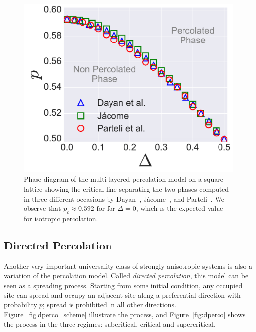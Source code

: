 \begin{figure}[t]
\begin{center}
    \includegraphics[scale=0.4]{chapters/ch5-anis/figs/mlp_ps0}
\end{center}
\caption{Phase diagram of the multi-layered percolation model on a square
    lattice showing the critical line separating the two phases computed in
    three different occasions by Dayan~\cite{Dayan1991},
    J\'acome~\cite{Samyr2009}, and Parteli~\cite{Parteli2010}. We observe that
    $p_c\approx0.592$ for for $\Delta=0$, which is the expected value for
    isotropic percolation.}
\label{fig:mlp_ps0}
\end{figure}


\subsection{Directed Percolation}
\label{sec:dp}

Another very important universality class of strongly anisotropic systems is
also a variation of the percolation model. Called \textit{directed
percolation}, this model can be seen as a spreading process. Starting from
some initial condition, any occupied site can spread and occupy an adjacent
site along a preferential direction with probability $p$; spread is prohibited
in all other directions. Figure~\ref{fig:dperco_scheme} illustrate the process,
and Figure~\ref{fig:dperco} shows the process in the three regimes:
subcritical, critical and supercritical.

